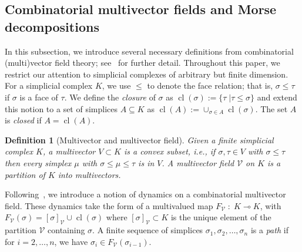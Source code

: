 \documentclass[a4paper,english,cleveref]{article}
\theoremstyle{plain}
\newtheorem{definition}{Definition}[section]
\renewcommand{\rho}{\varrho}
\def\cV{\text{$\mathcal V$}}
\newcommand{\cl}{\operatorname{cl}}
\newcounter{li}
\newcommand{\mv}{\mathcal{V}}
\newcommand\michal[1]{\textcolor{ForestGreen}{[ML: #1]}}
\newcommand{\Poset}{P}
\newcommand{\md}{\mathcal{M}}
\begin{document}
\subsection{Combinatorial multivector fields and Morse decompositions}
\label{sec:Cvec}
In this subsection, we introduce several necessary definitions from combinatorial (multi)vector field theory; see~
\cite{LKMW2022} for further detail.
Throughout this paper, we restrict our attention to simplicial complexes of arbitrary but finite dimension. For a simplicial complex $K$, we use $\leq$ to denote the face relation; that is, $\sigma \leq \tau$ if $\sigma$ is a face of $\tau$. We define the \emph{closure} of $\sigma$ as $\cl( \sigma ):= \{ \tau \; | \tau \leq \sigma \}$ and extend this notion to a set of simplices $A \subseteq K$ as $\cl(A) := \cup_{\sigma \in A} \cl( \sigma )$. The set $A$ is \emph{closed} if $A = \cl(A)$. 

\begin{definition}[Multivector and multivector field]
Given a finite simplicial complex $K$, a \emph{multivector} $V\subset K$ is a \emph{convex} subset, i.e., if $\sigma,\tau\in V$ with $\sigma\leq \tau$ then every simplex $\mu$ with $\sigma\leq \mu\leq\tau$ is in $V$.
A \emph{multivector field} $\mv$ on $K$ is a partition of $K$ into multivectors.
\end{definition}

Following~\cite{LKMW2022}, we introduce a notion of dynamics on a combinatorial multivector field. These dynamics take the form of a multivalued map $F_{\mv} \; : \; K \multimap K$, with $F_{\mv}(\sigma) = [ \sigma ]_{\mv} \cup \cl( \sigma )$ where $[ \sigma ]_{\mv}\subset K$ 
is the unique element of the partition $\cV$ containing $\sigma$. 
A finite sequence of simplices $\sigma_1, \sigma_2, \ldots, \sigma_n$ is a \emph{path} if for $i = 2, \ldots, n$, we have $\sigma_i \in F_{\mv{}}( \sigma_{i-1} )$.

\end{document}
